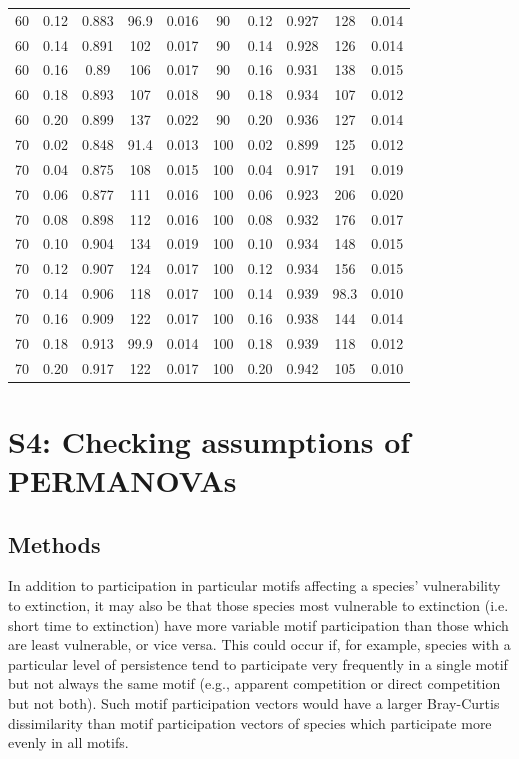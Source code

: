 \documentclass[12pt]{article}
\begin{document}
\begin{spacing}{2.0}
\begin{table}[h!]
\begin{tabular}{c c | c | c c ||c c | c | c c |}
				60	&	0.12	&	0.883	&	96.9	&	0.016	&	90	&	0.12	&	0.927	&	128	&	0.014	\\
				60	&	0.14	&	0.891	&	102	&	0.017	&	90	&	0.14	&	0.928	&	126	&	0.014	\\
				60	&	0.16	&	0.89	&	106	&	0.017	&	90	&	0.16	&	0.931	&	138	&	0.015	\\
				60	&	0.18	&	0.893	&	107	&	0.018	&	90	&	0.18	&	0.934	&	107	&	0.012	\\
				60	&	0.20	&	0.899	&	137	&	0.022	&	90	&	0.20	&	0.936	&	127	&	0.014	\\
				70	&	0.02	&	0.848	&	91.4	&	0.013	&	100	&	0.02	&	0.899	&	125	&	0.012	\\
				70	&	0.04	&	0.875	&	108	&	0.015	&	100	&	0.04	&	0.917	&	191	&	0.019	\\
				70	&	0.06	&	0.877	&	111	&	0.016	&	100	&	0.06	&	0.923	&	206	&	0.020	\\
				70	&	0.08	&	0.898	&	112	&	0.016	&	100	&	0.08	&	0.932	&	176	&	0.017	\\
				70	&	0.10	&	0.904	&	134	&	0.019	&	100	&	0.10	&	0.934	&	148	&	0.015	\\
				70	&	0.12	&	0.907	&	124	&	0.017	&	100	&	0.12	&	0.934	&	156	&	0.015	\\
				70	&	0.14	&	0.906	&	118	&	0.017	&	100	&	0.14	&	0.939	&	98.3	&	0.010	\\
				70	&	0.16	&	0.909	&	122	&	0.017	&	100	&	0.16	&	0.938	&	144	&	0.014	\\
				70	&	0.18	&	0.913	&	99.9	&	0.014	&	100	&	0.18	&	0.939	&	118	&	0.012	\\
				70	&	0.20	&	0.917	&	122	&	0.017	&	100	&	0.20	&	0.942	&	105	&	0.010	\\
				\hline
			\end{tabular}
			\end{table}

\clearpage


\section*{S4: Checking assumptions of PERMANOVAs}

	\subsection*{Methods}

        
        In addition to participation in particular motifs affecting a species' vulnerability to extinction, it may also be that those species most vulnerable to extinction (i.e. short time to extinction) have more variable motif participation than those which are least vulnerable, or vice versa. 
        This could occur if, for example, species with a particular level of persistence tend to participate very frequently in a single motif but not always the same motif (e.g., apparent competition or direct competition but not both). 
        Such motif participation vectors would have a larger Bray-Curtis dissimilarity than motif participation vectors of species which participate more evenly in all motifs.



\end{spacing}
\end{document}
